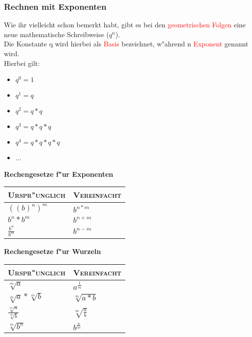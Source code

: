 \subsubsection{Rechnen mit Exponenten}
Wie ihr vielleicht schon bemerkt habt, gibt es bei den \textcolor{red}{geometrischen Folgen} eine neue mathematische Schreibweise ($q^n$).\\
Die Konstante q wird hierbei als \textcolor{red}{Basis} bezeichnet, w"ahrend n \textcolor{red}{Exponent} genannt wird.\\
Hierbei gilt:\\
\begin{itemize}
\item $q^0 = 1$
\item $q^1 = q$
\item $q^2 = q*q$
\item $q^3 = q*q*q$
\item $q^4 = q*q*q*q$
\item ...
\end{itemize}

\begin{center}
\textbf{Rechengesetze f"ur Exponenten}\\
\end{center}
\begin{tabular}{|>{\centering\arraybackslash}p{6.5 cm}|>{\centering\arraybackslash}p{6.5 cm}|}
\hline
\textsc{Urspr"unglich}&\textsc{Vereinfacht}\\
\hline
$((b)^n)^m$&$b^{n*m}$\\
\hline
$b^n * b^m$&$b^{n+m}$\\
\hline
$\frac{b^n}{b^m}$&$b^{n-m}$\\
\hline
\end{tabular}

\begin{center}
\textbf{Rechengesetze f"ur Wurzeln}
\end{center}
\begin{tabular}{|>{\centering\arraybackslash}p{6.5 cm}|>{\centering\arraybackslash}p{6.5 cm}|}
\hline
\textsc{Urspr"unglich}&\textsc{Vereinfacht}\\
\hline
$\sqrt[m]{a}$&$a^{\frac{1}{m}}$\\
\hline
$\sqrt[m]{a}*\sqrt[m]{b}$&$\sqrt[m]{a*b}$\\
\hline
$\frac{\sqrt[m]{a}}{\sqrt[m]{b}}$&$\sqrt[m]{\frac{a}{b}}$\\
\hline
$\sqrt[m]{b^n}$&$b^{\frac{n}{m}}$\\
\hline
\end{tabular}